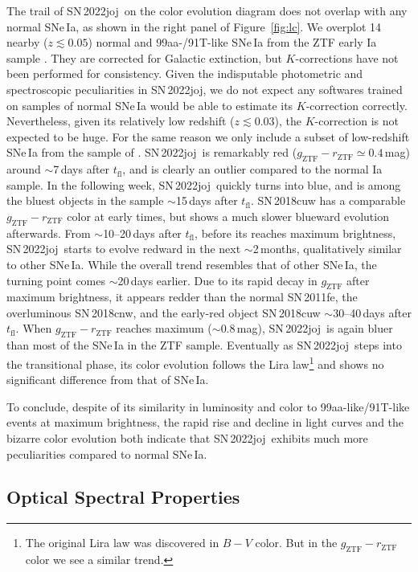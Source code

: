 \documentclass[twocolumn]{aastex631}
\newcommand{\sn}{SN\,2022joj}
\newcommand{\tfl}{$t_\mathrm{fl}$}
\begin{document}
\begin{CJK*}{UTF8}{gbsn}
The trail of \sn\ on the color evolution diagram does not overlap with any normal SNe\,Ia, as shown in the right panel of Figure~\ref{fig:lc}. We overplot 14 nearby ($z\lesssim0.05$) normal and 99aa-/91T-like SNe\,Ia from the ZTF early Ia sample \citep{Bulla2020}. They are corrected for Galactic extinction, but $K$-corrections have not been performed for consistency. Given the indisputable photometric and spectroscopic peculiarities in \sn, we do not expect any softwares trained on samples of normal SNe\,Ia would be able to estimate its $K$-correction correctly. Nevertheless, given its relatively low redshift ($z\lesssim0.03$), the $K$-correction is not expected to be huge. For the same reason we only include a subset of low-redshift SNe\,Ia from the sample of \citet{Bulla2020}. \sn\ is remarkably red ($g_\mathrm{ZTF} - r_\mathrm{ZTF}\simeq0.4$\,mag) around $\sim$7\,days after $t_\mathrm{fl}$, and is clearly an outlier compared to the normal Ia sample. In the following week, \sn\ quickly turns into blue, and is among the bluest objects in the sample $\sim$15\,days after $t_\mathrm{fl}$. SN\,2018cuw has a comparable $g_\mathrm{ZTF} - r_\mathrm{ZTF}$ color at early times, but shows a much slower blueward evolution afterwards. From $\sim$10--20\,days after \tfl, before its reaches maximum brightness, \sn\ starts to evolve redward in the next $\sim$2\,months, qualitatively similar to other SNe\,Ia. While the overall trend resembles that of other SNe\,Ia, the turning point comes $\sim$20\,days earlier. Due to its rapid decay in $g_\mathrm{ZTF}$ after maximum brightness, it appears redder than the normal SN\,2011fe, the overluminous SN\,2018cnw, and the early-red object SN\,2018cuw $\sim$30--40\,days after \tfl. When $g_\mathrm{ZTF} - r_\mathrm{ZTF}$ reaches maximum ($\sim$0.8\,mag), \sn\ is again bluer than most of the SNe\,Ia in the ZTF sample. Eventually as \sn\ steps into the transitional phase, its color evolution follows the Lira law\footnote{The original Lira law was discovered in $B-V$ color. But in the $g_\mathrm{ZTF}-r_\mathrm{ZTF}$ color we see a similar trend.} \citep{Lira_1996,Phillips_1999} and shows no significant difference from that of SNe\,Ia.

To conclude, despite of its similarity in luminosity and color to 99aa-like/91T-like events at maximum brightness, the rapid rise and decline in light curves and the bizarre color evolution both indicate that \sn\ exhibits much more peculiarities compared to normal SNe\,Ia.

\subsection{Optical Spectral Properties} 
\label{sec:analysis_spec}



\end{CJK*}
\end{document}
